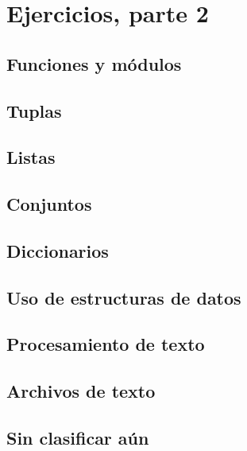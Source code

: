 \section{Ejercicios, parte 2}

\subsection{Funciones y módulos}

\subsection{Tuplas}

\subsection{Listas}

\subsection{Conjuntos}

\subsection{Diccionarios}

\subsection{Uso de estructuras de datos}

\subsection{Procesamiento de texto}

\subsection{Archivos de texto}

\subsection{Sin clasificar aún}
